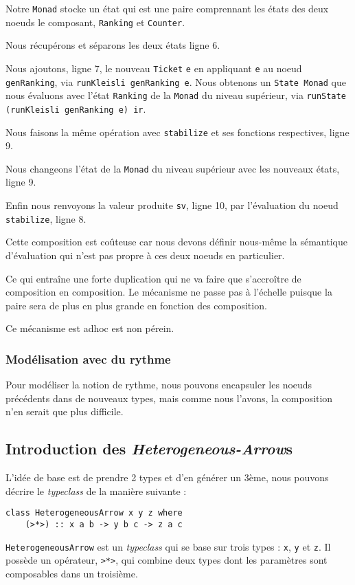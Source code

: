 \documentclass{llncs}
\newcommand{\SAs}{\emph{Heterogeneous-Arrow}s }
\newcommand{\HA}{\lstinline{HeterogeneousArrow} }
\begin{document}
Notre \lstinline{Monad} stocke un état qui est une paire comprennant les états
des deux noeuds le composant, \lstinline{Ranking} et \lstinline{Counter}.

Nous récupérons et séparons les deux états ligne 6.

Nous ajoutons, ligne 7, le nouveau \lstinline{Ticket} \lstinline{e} en appliquant \lstinline{e}
au noeud \lstinline{genRanking}, via \lstinline{runKleisli genRanking e}.
Nous obtenons un \lstinline{State Monad} que nous évaluons avec l'état \lstinline{Ranking}
de la \lstinline{Monad} du niveau supérieur, via \lstinline{runState (runKleisli genRanking e) ir}.

Nous faisons la même opération avec \lstinline{stabilize} et ses fonctions respectives,
ligne 9.

Nous changeons l'état de la \lstinline{Monad} du niveau supérieur avec les nouveaux
états, ligne 9.

Enfin nous renvoyons la valeur produite \lstinline{sv}, ligne 10, par l'évaluation
du noeud \lstinline{stabilize}, ligne 8.

Cette composition est coûteuse car nous devons définir nous-même la sémantique
d'évaluation qui n'est pas propre à ces deux noeuds en particulier.

Ce qui entraîne une forte duplication qui ne va faire que s'accroître de
composition en composition.
Le mécanisme ne passe pas à l'échelle puisque la paire sera de plus en plus
grande en fonction des composition.

Ce mécanisme est adhoc est non pérein.

\subsubsection{Modélisation avec du rythme}
Pour modéliser la notion de rythme, nous pouvons encapsuler les noeuds
précédents dans de nouveaux types, mais comme nous l'avons, la composition
n'en serait que plus difficile.

\subsection{Introduction des \SAs}
L'idée de base est de prendre 2 types et d'en générer un 3ème, nous pouvons
décrire le \emph{typeclass} de la manière suivante :
\begin{lstlisting}
class HeterogeneousArrow x y z where
    (>*>) :: x a b -> y b c -> z a c
\end{lstlisting}
\HA est un \emph{typeclass} qui se base sur trois types : \lstinline{x},
\lstinline{y} et \lstinline{z}.
Il possède un opérateur, \lstinline{>*>}, qui combine deux types dont les
paramètres sont composables dans un troisième.
\end{document}
